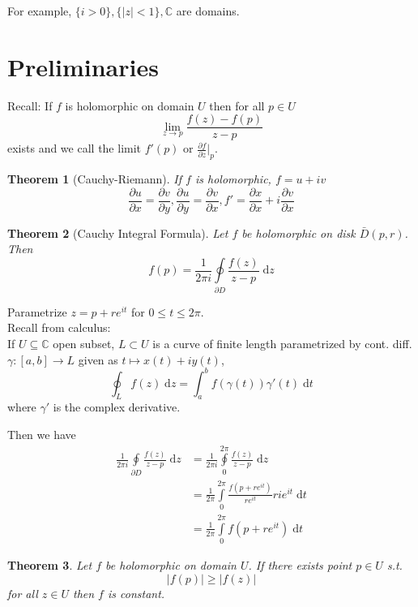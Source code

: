 \documentclass{article}
\newtheorem{theorem}{Theorem}
\begin{document}
For example, $\{i > 0\}, \{|z| < 1\}, \mathbb{C}$ are domains.


\section{Preliminaries}
Recall: If $f$ is holomorphic on domain $U$ then for all $p \in U$
$$\lim_{z \to p} \frac{f(z) - f(p)}{z - p}$$
exists and we call the limit $f'(p)$ or $\frac{\partial f}{\partial z} |_p$.

\begin{theorem}[Cauchy-Riemann]
If $f$ is holomorphic, $f = u + iv$
$$\frac{\partial u}{\partial x} = \frac{\partial v}{\partial y}, \frac{\partial u}{\partial y} = \frac{\partial v}{\partial x}, f' = \frac{\partial x}{\partial x} + i \frac{\partial v}{\partial x}$$
\end{theorem}

\begin{theorem}[Cauchy Integral Formula]
Let $f$ be holomorphic on disk $\bar{D}(p,r)$. Then
$$f(p) = \frac{1}{2\pi i} \oint\limits_{\partial D} \frac{f(z)}{z-p} \;\mathrm{d}z$$
\end{theorem}

Parametrize $z = p + re^{it}$ for $0 \leq t \leq 2\pi$.\\
Recall from calculus:\\
If $U \subseteq \mathbb{C}$ open subset, $L \subset U$ is a curve of finite length parametrized by cont. diff. $\gamma : [a,b] \to L$ given as $t \mapsto x(t) + iy(t)$,
$$\oint_L f(z) \;\mathrm{d}z = \int_a^b f(\gamma(t))\gamma'(t) \;\mathrm{d}t$$
where $\gamma'$ is the complex derivative.

Then we have
\begin{equation*}
\begin{split}
\frac{1}{2\pi i} \oint\limits_{\partial D} \frac{f(z)}{z-p} \;\mathrm{d}z &= \frac{1}{2\pi i} \oint\limits_0^{2\pi} \frac{f(z)}{z-p} \;\mathrm{d}z\\
&= \frac{1}{2\pi} \int\limits_0^{2\pi} \frac{f(p + re^{it})}{re^{it}} rie^{it} \;\mathrm{d}t\\
&= \frac{1}{2\pi} \int\limits_0^{2\pi} f(p + re^{it}) \;\mathrm{d}t
\end{split}
\end{equation*}

\begin{theorem}
Let $f$ be holomorphic on domain $U$. If there exists point $p \in U$ s.t.
$$|f(p)| \geq |f(z)|$$
for all $z \in U$ then $f$ is constant.
\end{theorem}
\end{document}

